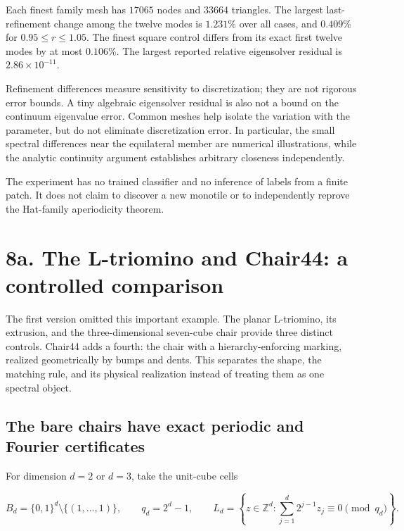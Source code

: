 \documentclass[11pt]{article}
\begin{document}
Each finest family mesh has \(17065\) nodes and \(33664\) triangles. The largest last-refinement change among the twelve modes is \(1.231\%\) over all cases, and \(0.409\%\) for \(0.95\le r\le1.05\). The finest square control differs from its exact first twelve modes by at most \(0.106\%\). The largest reported relative eigensolver residual is \(2.86\times10^{-11}\).



Refinement differences measure sensitivity to discretization; they are not rigorous error bounds. A tiny algebraic eigensolver residual is also not a bound on the continuum eigenvalue error. Common meshes help isolate the variation with the parameter, but do not eliminate discretization error. In particular, the small spectral differences near the equilateral member are numerical illustrations, while the analytic continuity argument establishes arbitrary closeness independently.



The experiment has no trained classifier and no inference of labels from a finite patch. It does not claim to discover a new monotile or to independently reprove the Hat-family aperiodicity theorem.




\section*{8a. The L-triomino and Chair44: a controlled comparison}


The first version omitted this important example. The planar L-triomino, its extrusion, and the three-dimensional seven-cube chair provide three distinct controls. Chair44 adds a fourth: the chair with a hierarchy-enforcing marking, realized geometrically by bumps and dents. This separates the shape, the matching rule, and its physical realization instead of treating them as one spectral object.



\subsection*{The bare chairs have exact periodic and Fourier certificates}


For dimension \(d=2\) or \(d=3\), take the unit-cube cells


\[ B_d=\{0,1\}^d\setminus\{(1,\ldots,1)\},\qquad q_d=2^d-1,\qquad
L_d=\left\{z\in\mathbb Z^d:\sum_{j=1}^d2^{j-1}z_j\equiv0\pmod{q_d}\right\}. \]
\end{document}
